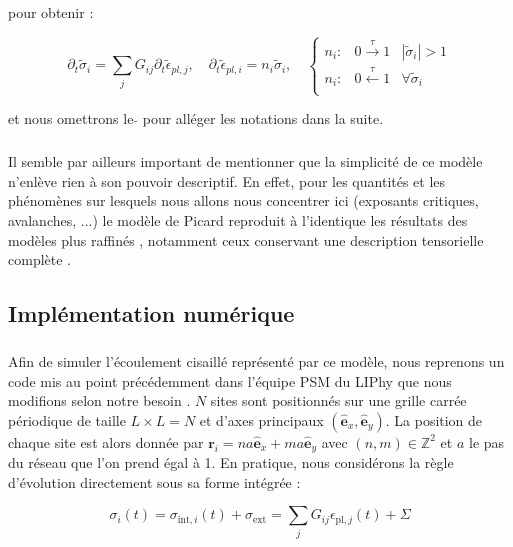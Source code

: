\noindent pour obtenir :

\begin{equation}
	\partial_t\tilde{\sigma}_i = \sum_{j}G_{ij}\partial_t \tilde{\epsilon}_{pl,j},\quad \partial_t \tilde{\epsilon}_{pl,i} = n_i \tilde{\sigma}_i,\quad
	\left\{
    \begin{array}{lcc}
    n_i: & 0\xrightarrow{\tau}1 & |\tilde{\sigma}_i|>1 \\
    n_i: & 0\xleftarrow{\tau}1 & \forall \tilde{\sigma}_i\\
    \end{array}
    \right.
\label{eq:PicardRulesAdim}
\end{equation}

\noindent et nous omettrons le $\tilde{}$ pour alléger les notations dans la suite.

\subparagraph{}Il semble par ailleurs important de mentionner que la simplicité de ce modèle n'enlève rien à son pouvoir descriptif. En effet, pour les quantités et les phénomènes sur lesquels nous allons nous concentrer ici (exposants critiques, avalanches, ...) le modèle de Picard reproduit à l'identique les résultats des modèles plus raffinés \cite{ferrero_criticality_2019}, notamment ceux conservant une description tensorielle complète \cite{nicolas_deformation_2018, budrikis_universal_2017}.

\subsection{Implémentation numérique}

\subparagraph{}Afin de simuler l'écoulement cisaillé représenté par ce modèle, nous reprenons un code mis au point précédemment dans l'équipe PSM du LIPhy que nous modifions selon notre besoin \cite{martens_connecting_2011, liu_driving_2016}. $N$ sites sont positionnés sur une grille carrée périodique de taille $L\times L = N$ et d'axes principaux $(\hat{\mathbf{e}}_x, \hat{\mathbf{e}}_y)$. La position de chaque site est alors donnée par $\mathbf{r}_i = na\hat{\mathbf{e}}_x + ma \hat{\mathbf{e}}_y$ avec $(n,m) \in \mathbb{Z}^2$ et $a$ le pas du réseau que l'on prend égal à 1. En pratique, nous considérons la règle d'évolution directement sous sa forme intégrée :

\begin{equation}
	\sigma_i(t) = \sigma_{\text{int},i}(t)+\sigma_\text{ext} =  \sum_{j}G_{ij}\epsilon_{\text{pl},j}(t)+\Sigma
	\label{eq:DynPicardInteg}
\end{equation}

